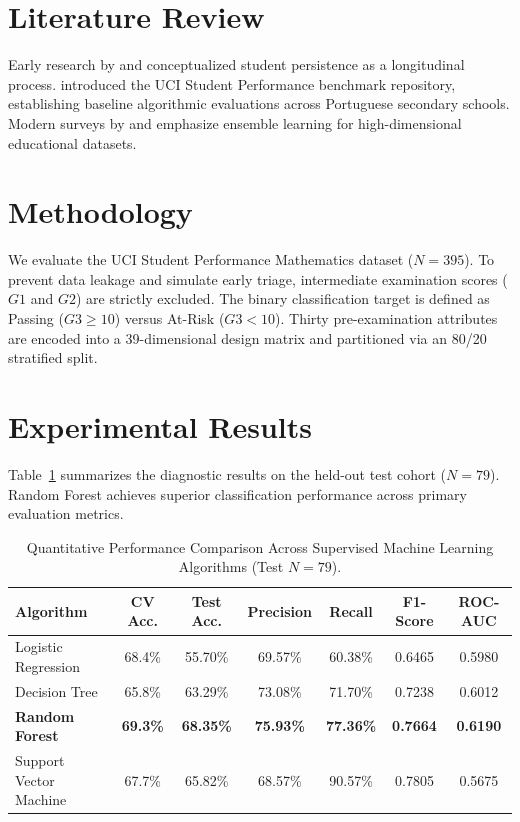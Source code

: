 \documentclass[twoside,11pt]{article}
\begin{document}
\section{Literature Review}
Early research by \cite{tinto1975} and \cite{bean1985} conceptualized student persistence as a longitudinal process. \cite{cortez2008} introduced the UCI Student Performance benchmark repository, establishing baseline algorithmic evaluations across Portuguese secondary schools. Modern surveys by \cite{romero2020} and \cite{kotsiantis2012} emphasize ensemble learning for high-dimensional educational datasets.

\section{Methodology}
We evaluate the UCI Student Performance Mathematics dataset ($N = 395$). To prevent data leakage and simulate early triage, intermediate examination scores ($G1$ and $G2$) are strictly excluded. The binary classification target is defined as Passing ($G3 \geq 10$) versus At-Risk ($G3 < 10$). Thirty pre-examination attributes are encoded into a 39-dimensional design matrix and partitioned via an 80/20 stratified split.

\section{Experimental Results}
Table~\ref{tab:results} summarizes the diagnostic results on the held-out test cohort ($N = 79$). Random Forest achieves superior classification performance across primary evaluation metrics.

\begin{table}[h]
\centering
\caption{Quantitative Performance Comparison Across Supervised Machine Learning Algorithms (Test $N = 79$).}
\label{tab:results}
\begin{tabular}{lcccccc}
\toprule
\textbf{Algorithm} & \textbf{CV Acc.} & \textbf{Test Acc.} & \textbf{Precision} & \textbf{Recall} & \textbf{F1-Score} & \textbf{ROC-AUC} \\
\midrule
Logistic Regression & 68.4\% & 55.70\% & 69.57\% & 60.38\% & 0.6465 & 0.5980 \\
Decision Tree & 65.8\% & 63.29\% & 73.08\% & 71.70\% & 0.7238 & 0.6012 \\
\textbf{Random Forest} & \textbf{69.3\%} & \textbf{68.35\%} & \textbf{75.93\%} & \textbf{77.36\%} & \textbf{0.7664} & \textbf{0.6190} \\
Support Vector Machine & 67.7\% & 65.82\% & 68.57\% & 90.57\% & 0.7805 & 0.5675 \\
\bottomrule
\end{tabular}
\end{table}
\end{document}
